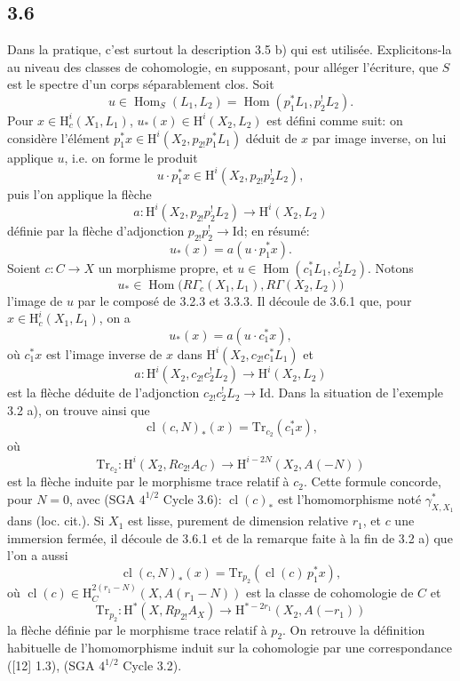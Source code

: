 \documentclass[11pt]{article}
\renewcommand{\H}{\mathrm{H}}
\DeclareMathOperator{\Hom}{Hom}
\providecommand{\Id}{\mathrm{Id}}
\providecommand{\Hom}{\operatorname{Hom}}
\begin{document}
\subsection*{3.6}
Dans la pratique, c'est surtout la description 3.5 b) qui est utilisée. Explicitons-la au niveau des classes de cohomologie, en supposant, pour alléger l'écriture, que $S$ est le spectre d'un corps séparablement clos. Soit
\[
u\in\Hom_S(L_1,L_2)=\Hom(p_1^*L_1,p_2^!L_2).
\]
Pour $x\in\H_c^i(X_1,L_1)$, $u_*(x)\in\H^i(X_2,L_2)$ est défini comme suit: on considère l'élément $p_1^*x\in\H^i(X_2,p_{2!}p_1^*L_1)$ déduit de $x$ par image inverse, on lui applique $u$, i.e. on forme le produit
\[
u\cdot p_1^*x\in \H^i(X_2,p_{2!}p_2^!L_2),
\]
puis l'on applique la flèche
\[
a:\H^i(X_2,p_{2!}p_2^!L_2)\longrightarrow \H^i(X_2,L_2)
\]
définie par la flèche d'adjonction $p_{2!}p_2^!\to\Id$; en résumé:
\begin{equation}
u_*(x)=a(u\cdot p_1^*x).
\tag{3.6.1}
\end{equation}
Soient $c:C\to X$ un morphisme propre, et $u\in\Hom(c_1^*L_1,c_2^!L_2)$. Notons
\[
u_*\in\Hom\bigl(R\Gamma_c(X_1,L_1),R\Gamma(X_2,L_2)\bigr)
\]
l'image de $u$ par le composé de 3.2.3 et 3.3.3. Il découle de 3.6.1 que, pour $x\in\H_c^i(X_1,L_1)$, on a
\begin{equation}
u_*(x)=a(u\cdot c_1^*x),
\tag{3.6.2}
\end{equation}
où $c_1^*x$ est l'image inverse de $x$ dans $\H^i(X_2,c_{2!}c_1^*L_1)$ et
\[
a:\H^i(X_2,c_{2!}c_2^!L_2)\longrightarrow \H^i(X_2,L_2)
\]
est la flèche déduite de l'adjonction $c_{2!}c_2^!L_2\to\Id$. Dans la situation de l'exemple 3.2 a), on trouve ainsi que
\begin{equation}
\operatorname{cl}(c,N)_*(x)=\mathrm{Tr}_{c_2}(c_1^*x),
\tag{3.6.3}
\end{equation}
où
\[
\mathrm{Tr}_{c_2}:\H^i(X_2,Rc_{2!}A_C)\longrightarrow\H^{i-2N}(X_2,A(-N))
\]
est la flèche induite par le morphisme trace relatif à $c_2$. Cette formule concorde, pour $N=0$, avec (SGA $4^{1/2}$ Cycle 3.6): $\operatorname{cl}(c)_*$ est l'homomorphisme noté $\gamma^*_{X,X_1}$ dans (loc. cit.). Si $X_1$ est lisse, purement de dimension relative $r_1$, et $c$ une immersion fermée, il découle de 3.6.1 et de la remarque faite à la fin de 3.2 a) que l'on a aussi
\begin{equation}
\operatorname{cl}(c,N)_*(x)=\mathrm{Tr}_{p_2}(\operatorname{cl}(c)\,p_1^*x),
\tag{3.6.4}
\end{equation}
où $\operatorname{cl}(c)\in \H_C^{2(r_1-N)}(X,A(r_1-N))$ est la classe de cohomologie de $C$ et
\[
\mathrm{Tr}_{p_2}:\H^*(X,Rp_{2!}A_X)\longrightarrow \H^{*-2r_1}(X_2,A(-r_1))
\]
la flèche définie par le morphisme trace relatif à $p_2$. On retrouve la définition habituelle de l'homomorphisme induit sur la cohomologie par une correspondance ([12] 1.3), (SGA $4^{1/2}$ Cycle 3.2).
\end{document}
